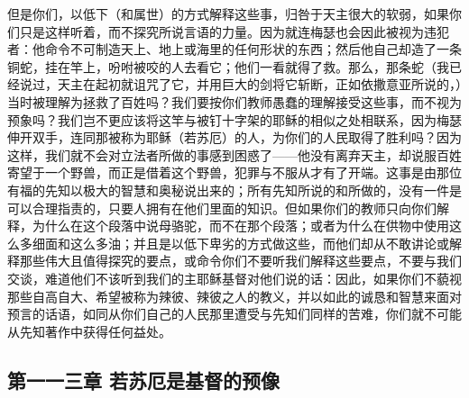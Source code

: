 但是你们，以低下（和属世）的方式解释这些事，归咎于天主很大的软弱，如果你们只是这样听着，而不探究所说言语的力量。因为就连梅瑟也会因此被视为违犯者：他命令不可制造天上、地上或海里的任何形状的东西；然后他自己却造了一条铜蛇，挂在竿上，吩咐被咬的人去看它；他们一看就得了救。那么，那条蛇（我已经说过，天主在起初就诅咒了它，并用巨大的剑将它斩断，正如依撒意亚所说的，）当时被理解为拯救了百姓吗？我们要按你们教师愚蠢的理解接受这些事，而不视为预象吗？我们岂不更应该将这竿与被钉十字架的耶稣的相似之处相联系，因为梅瑟伸开双手，连同那被称为耶稣（若苏厄）的人，为你们的人民取得了胜利吗？因为这样，我们就不会对立法者所做的事感到困惑了——他没有离弃天主，却说服百姓寄望于一个野兽，而正是借着这个野兽，犯罪与不服从才有了开端。这事是由那位有福的先知以极大的智慧和奥秘说出来的；所有先知所说的和所做的，没有一件是可以合理指责的，只要人拥有在他们里面的知识。但如果你们的教师只向你们解释，为什么在这个段落中说母骆驼，而不在那个段落；或者为什么在供物中使用这么多细面和这么多油；并且是以低下卑劣的方式做这些，而他们却从不敢讲论或解释那些伟大且值得探究的要点，或命令你们不要听我们解释这些要点，不要与我们交谈，难道他们不该听到我们的主耶稣基督对他们说的话：因此，如果你们不藐视那些自高自大、希望被称为辣彼、辣彼之人的教义，并以如此的诚恳和智慧来面对预言的话语，如同从你们自己的人民那里遭受与先知们同样的苦难，你们就不可能从先知著作中获得任何益处。\par


\subsection{第一一三章 若苏厄是基督的预像}

